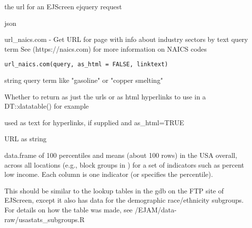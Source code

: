 \documentclass[a4paper]{book}
\begin{document}
%
\begin{Arguments}
\begin{ldescription}
\item[\code{url}] the url for an EJScreen ejquery request
\end{ldescription}
\end{Arguments}
%
\begin{Value}
json
\end{Value}
%
\begin{Description}\relax
url\_naics.com - Get URL for page with info about industry sectors by text query term
See (https://naics.com) for more information on NAICS codes
\end{Description}
%
\begin{Usage}
\begin{verbatim}
url_naics.com(query, as_html = FALSE, linktext)
\end{verbatim}
\end{Usage}
%
\begin{Arguments}
\begin{ldescription}
\item[\code{query}] string query term like "gasoline" or "copper smelting"

\item[\code{as\_html}] Whether to return as just the urls or as html hyperlinks to use in a DT::datatable() for example

\item[\code{linktext}] used as text for hyperlinks, if supplied and as\_html=TRUE
\end{ldescription}
\end{Arguments}
%
\begin{Value}
URL as string
\end{Value}
%
\begin{Description}\relax
data.frame of 100 percentiles and means (about 100 rows)
in the USA overall, across all locations (e.g., block groups in )
for a set of indicators such as percent low income.
Each column is one indicator (or specifies the percentile).

This should be similar to the lookup tables in the gdb on the FTP site of EJScreen,
except it also has data for the demographic race/ethnicity subgroups.
For details on how the table was made, see /EJAM/data-raw/usastats\_subgroups.R
\end{Description}
\end{document}
